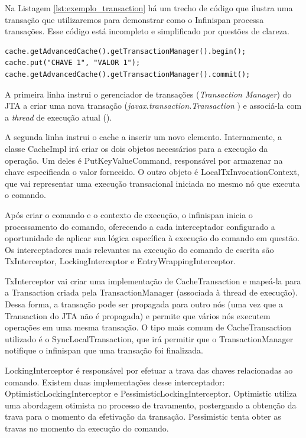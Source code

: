 \documentclass[11pt,twoside,a4paper]{book}
\begin{document}
Na Listagem \ref{lst:exemplo_transaction} há um trecho de código que ilustra uma transação que utilizaremos para demonstrar como o Infinispan processa transações. Esse código está incompleto e simplificado por questões de clareza.

\begin{lstlisting}[caption={Transação convencional}, label=lst:exemplo_transaction]
cache.getAdvancedCache().getTransactionManager().begin();
cache.put("CHAVE 1", "VALOR 1");
cache.getAdvancedCache().getTransactionManager().commit();
\end{lstlisting}

A primeira linha instrui o gerenciador de transações (\emph{Transaction Manager}) do JTA a criar uma nova transação (\emph{javax.transaction.Transaction} \cite{jta}) e associá-la com a \emph{thread} de execução atual (\cite{ipc}). 

A segunda linha instrui o cache a inserir um novo elemento. Internamente, a classe CacheImpl irá criar os dois objetos necessários para a execução da operação. Um deles é PutKeyValueCommand, responsável por armazenar na chave especificada o valor fornecido. O outro objeto é LocalTxInvocationContext, que vai representar uma execução transacional iniciada no mesmo nó que executa o comando. 

Após criar o comando e o contexto de execução, o infinispan inicia o processamento do comando, oferecendo a cada interceptador configurado a oportunidade de aplicar sua lógica específica à execução do comando em questão. Os interceptadores mais relevantes na execução do comando de escrita são TxInterceptor, LockingInterceptor e EntryWrappingInterceptor.

TxInterceptor vai criar uma implementação de CacheTransaction e mapeá-la para a Transaction criada pela TransactionManager (associada à thread de execução). Dessa forma, a transação pode ser propagada para outro nós (uma vez que a Transaction do JTA não é propagada) e permite que vários nós executem operações em uma mesma transação. O tipo mais comum de CacheTransaction utilizado é o SyncLocalTransaction, que irá permitir que o TransactionManager notifique o infinispan que uma transação foi finalizada.

LockingInterceptor é responsável por efetuar a trava das chaves relacionadas ao comando. Existem duas implementações desse interceptador: OptimisticLockingInterceptor e PessimisticLockingInterceptor. Optimistic utiliza uma abordagem otimista no processo de travamento, postergando a obtenção da trava para o momento da efetivação da transação. Pessimistic tenta obter as travas no momento da execução do comando.
\end{document}
